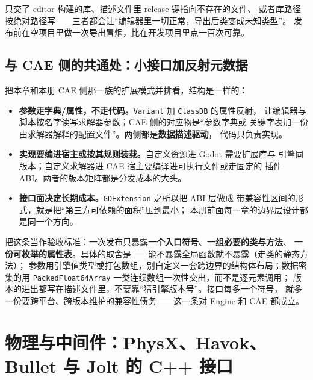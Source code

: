 \documentclass[12pt,a4paper,fontset=fandol]{ctexbook}
\newcommand{\Tp}[1]{\texttt{#1}}
\newcommand{\Lang}[1]{\textsf{#1}}
\newcommand{\DomCAE}{\Lang{CAE}}
\newcommand{\DomEngine}{\Lang{Engine}}
\begin{document}
\begin{note}[title={分发时最常漏的一件事}]
只交了 editor 构建的库、描述文件里 release 键指向不存在的文件、
或者库路径按绝对路径写——三者都会让``编辑器里一切正常，导出后类变成未知类型''。
发布前在空项目里做一次导出冒烟，比在开发项目里点一百次可靠。
\end{note}

\section{与 CAE 侧的共通处：小接口加反射元数据}
\label{sec:ch12-cae-crossover}

把本章和本册 \DomCAE{} 侧那一族的扩展模式并排看，结构是一样的：

\begin{itemize}
  \item \textbf{参数走字典/属性，不走代码。}\Tp{Variant} 加 \Tp{ClassDB} 的属性反射，
        让编辑器与脚本按名字读写求解器参数；\DomCAE{} 侧的对应物是``参数字典或
        关键字表加一份由求解器解释的配置文件''。两侧都是\textbf{数据描述驱动}，
        代码只负责实现。
  \item \textbf{实现要编进宿主或按其规则装载。}自定义资源进 Godot 需要扩展库与
        引擎同版本；自定义求解器进 \DomCAE{} 宿主要编译进可执行文件或走固定的
        插件 ABI。两者的版本矩阵都是分发成本的大头。
  \item \textbf{接口面决定长期成本。}\Tp{GDExtension} 之所以把 ABI 层做成
        带兼容性区间的形式，就是把``第三方可依赖的面积''压到最小；
        本册前面每一章的边界层设计都是同一个方向。
\end{itemize}

\begin{bestpractice}[title={扩展接口越小越好}]
把这条当作验收标准：一次发布只暴露\textbf{一个入口符号}、\textbf{一组必要的类与方法}、
\textbf{一份可枚举的属性表}。具体的取舍是——能不暴露全局函数就不暴露（走类的静态方法）；
参数用引擎值类型或打包数组，别自定义一套跨边界的结构体布局；数据密集的用
\Tp{PackedFloat64Array} 一类连续数组一次性交出，而不是逐元素调用；
版本的进出都写在描述文件里，不要靠``猜引擎版本号''。接口每多一个符号，
就多一份要跨平台、跨版本维护的兼容性债务——这一条对 \DomEngine{} 和 \DomCAE{} 都成立。
\end{bestpractice}

\chapter{物理与中间件：PhysX、Havok、Bullet 与 Jolt 的 C++ 接口}
\label{ch:ch13-physics}
\end{document}
